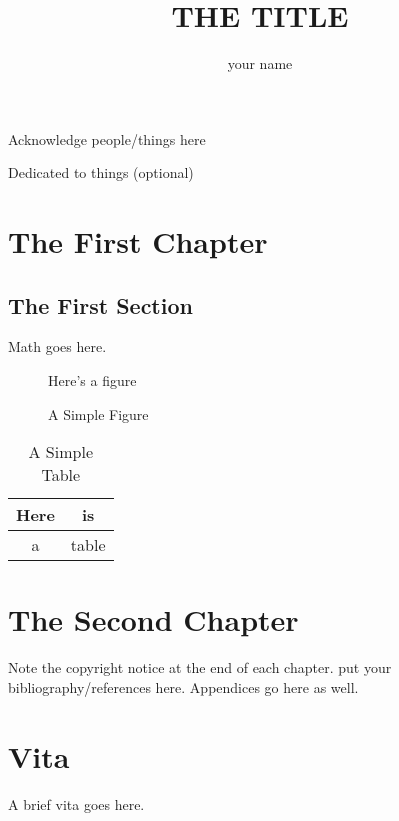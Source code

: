 \documentclass[final]{ukthesis}
\begin{document}
\author{your name}
\title{THE TITLE}
\frontmatter
\maketitle
\begin{acknowledgments}
Acknowledge people/things here
\end{acknowledgments}
\begin{dedication}
Dedicated to things (optional)
\end{dedication}
\tableofcontents\clearpage
\listoffigures\clearpage
\listoftables\clearpage
\mainmatter
\chapter{The First Chapter}
\section{The First Section}
Math goes here.
\begin{figure}[h]
\centering
Here's a figure
\caption{A Simple Figure}
\end{figure}
\begin{table}[h]
\centering
\begin{tabular}{c|c}
Here & is \\
\hline
a & table
\end{tabular}
\caption{A Simple Table}
\end{table}
\copyrightnotice
\chapter{The Second Chapter}
Note the copyright notice at the end of each chapter.
\copyrightnotice
\backmatter
put your bibliography/references here.  Appendices go here as well. 
\chapter{Vita}
A brief vita goes here.
\end{document}
